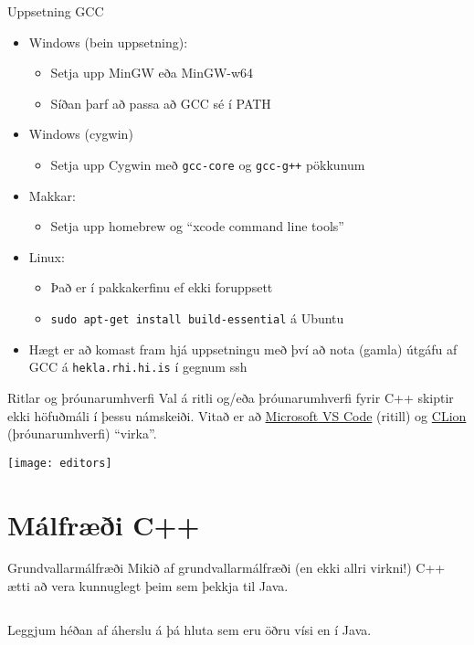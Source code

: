 \documentclass[handout]{beamer}
\begin{document}
\begin{frame}{Uppsetning GCC}
\begin{itemize}
 \item Windows (bein uppsetning):
 \begin{itemize}
  \item Setja upp MinGW eða MinGW-w64
  \item Síðan þarf að passa að GCC sé í PATH
 \end{itemize}
 \item Windows (cygwin)
 \begin{itemize}
  \item Setja upp Cygwin með \texttt{gcc-core} og \texttt{gcc-g++} pökkunum
 \end{itemize}
 \item Makkar: 
 \begin{itemize}
  \item Setja upp homebrew og ``xcode command line tools''
 \end{itemize}
 \item Linux:
 \begin{itemize}
  \item Það er í pakkakerfinu ef ekki foruppsett
  \item \texttt{sudo apt-get install build-essential} á Ubuntu
 \end{itemize}
 \item Hægt er að komast fram hjá uppsetningu með því að nota (gamla) útgáfu af GCC á \texttt{hekla.rhi.hi.is} í gegnum ssh
\end{itemize}
\end{frame}

\begin{frame}{Ritlar og þróunarumhverfi}
Val á ritli og/eða þróunarumhverfi fyrir C++ skiptir ekki höfuðmáli í þessu námskeiði. Vitað er að \href{https://code.visualstudio.com/}{Microsoft VS Code} (ritill) og \href{https://www.jetbrains.com/student/}{CLion} (þróunarumhverfi) ``virka''.

\begin{center}
\texttt{[image: editors]}
\end{center}
\end{frame}

\section{Málfræði C++}

\begin{frame}[fragile]{Grundvallarmálfræði}
Mikið af grundvallarmálfræði (en ekki allri virkni!) C++ ætti að vera kunnuglegt þeim sem þekkja til Java.
\begin{columns}
\end{columns}
Leggjum héðan af áherslu á þá hluta sem eru öðru vísi en í Java.
\end{frame}
\end{document}
